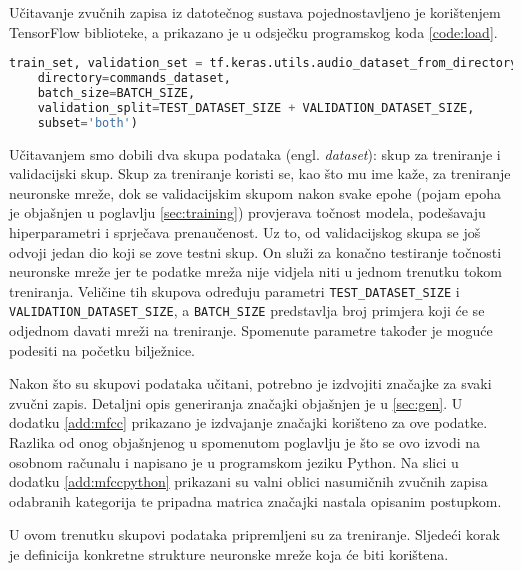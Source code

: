 Učitavanje zvučnih zapisa iz datotečnog sustava pojednostavljeno je korištenjem
TensorFlow biblioteke, a prikazano je u odsječku programskog koda \ref{code:load}.

\begin{lstlisting}[language=Python, caption=Učitavanje zvučnih zapisa, label=code:load]
train_set, validation_set = tf.keras.utils.audio_dataset_from_directory(
    directory=commands_dataset,
    batch_size=BATCH_SIZE,
    validation_split=TEST_DATASET_SIZE + VALIDATION_DATASET_SIZE,
    subset='both')
\end{lstlisting}

Učitavanjem smo dobili dva skupa podataka (engl. \textit{dataset}): skup za treniranje i validacijski skup.
Skup za treniranje koristi se, kao što mu ime kaže, za treniranje neuronske mreže,
dok se validacijskim skupom nakon svake epohe (pojam epoha je objašnjen u poglavlju \ref{sec:training}) 
provjerava točnost modela, podešavaju
hiperparametri i sprječava prenaučenost.
Uz to, od validacijskog skupa se još odvoji jedan dio koji se zove testni skup. On služi
za konačno testiranje točnosti neuronske mreže jer te podatke mreža nije vidjela niti
u jednom trenutku tokom treniranja. Veličine tih skupova određuju parametri 
\texttt{TEST\_DATASET\_SIZE} i \texttt{VALIDATION\_DATASET\_SIZE}, a \texttt{BATCH\_SIZE} predstavlja
broj primjera koji će se odjednom davati mreži na treniranje. Spomenute parametre
također je moguće podesiti na početku bilježnice. 

Nakon što su skupovi podataka učitani, potrebno je izdvojiti značajke za svaki zvučni zapis.
Detaljni opis generiranja značajki objašnjen je u \ref{sec:gen}. U dodatku \ref{add:mfcc} prikazano
je izdvajanje značajki korišteno za ove podatke. Razlika od onog objašnjenog u spomenutom poglavlju
je što se ovo izvodi na osobnom računalu i napisano je u programskom jeziku Python.
Na slici u dodatku \ref{add:mfccpython} prikazani su valni oblici nasumičnih zvučnih zapisa odabranih 
kategorija te pripadna matrica značajki nastala opisanim postupkom.

U ovom trenutku skupovi podataka pripremljeni su za treniranje. Sljedeći korak je definicija 
konkretne strukture neuronske mreže koja će biti korištena.